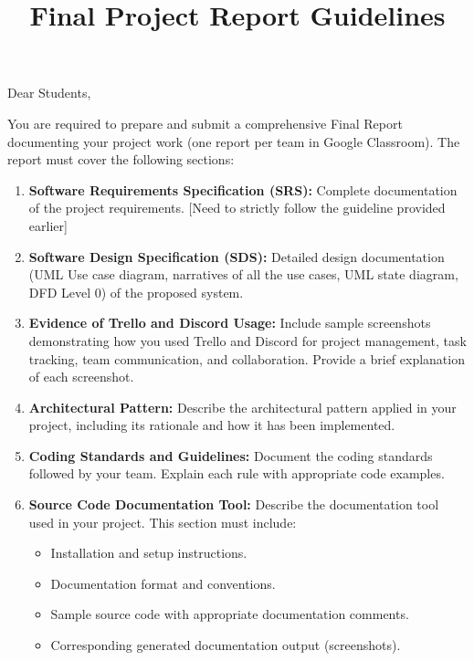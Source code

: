 \documentclass[11pt,a4paper]{article}
\title{\textbf{Final Project Report Guidelines}}
\date{}
\begin{document}
\maketitle

\noindent Dear Students,

\medskip

You are required to prepare and submit a comprehensive Final Report documenting your project work (one report per team in Google Classroom). The report must cover the following sections:

\begin{enumerate}
    \item \textbf{Software Requirements Specification (SRS):} Complete documentation of the project requirements. [Need to strictly follow the guideline provided earlier]

    \item \textbf{Software Design Specification (SDS):} Detailed design documentation (UML Use case diagram, narratives of all the use cases, UML state diagram, DFD Level 0) of the proposed system.

    \item \textbf{Evidence of Trello and Discord Usage:} Include sample screenshots demonstrating how you used Trello and Discord for project management, task tracking, team communication, and collaboration. Provide a brief explanation of each screenshot.

    \item \textbf{Architectural Pattern:} Describe the architectural pattern applied in your project, including its rationale and how it has been implemented.

    \item \textbf{Coding Standards and Guidelines:} Document the coding standards followed by your team. Explain each rule with appropriate code examples.

    \item \textbf{Source Code Documentation Tool:} Describe the documentation tool used in your project. This section must include:
    \begin{itemize}
        \item Installation and setup instructions.
        \item Documentation format and conventions.
        \item Sample source code with appropriate documentation comments.
        \item Corresponding generated documentation output (screenshots).
    \end{itemize}


\end{enumerate}
\end{document}
